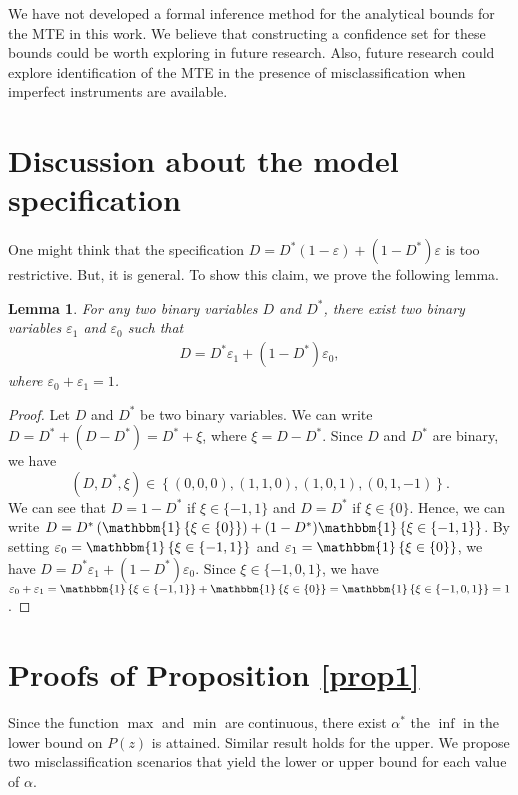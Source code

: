 \documentclass[11pt,reqno]{amsart}
\theoremstyle{plain}
\newtheorem{lemma}{Lemma}
\numberwithin{equation}{section}
\begin{document}
We have not developed a formal inference method for the analytical bounds for the MTE in this work. We believe that constructing a confidence set for these bounds could be worth exploring in future research. Also, future research could explore identification of the MTE in the presence of misclassification when imperfect instruments are available. 

\clearpage
\appendix

\section{Discussion about the model specification}\label{apx:spec}
One might think that the specification $D=D^* (1-\varepsilon) +(1-D^*)\varepsilon$ is too restrictive. But, it is general. To show this claim, we prove the following lemma.
\begin{lemma}\label{misc:specific}
For any two binary variables $D$ and $D^*$, there exist two binary variables $\varepsilon_1$ and $\varepsilon_0$ such that 
\begin{eqnarray}
D=D^* \varepsilon_1 +(1-D^*)\varepsilon_0,
\end{eqnarray}
where $\varepsilon_0+\varepsilon_1=1$.
\end{lemma}
\begin{proof}
Let $D$ and $D^*$ be two binary variables. We can write $D=D^*+(D-D^*)=D^*+\xi$, where $\xi=D-D^*$. Since $D$ and $D^*$ are binary, we have $$\left(D,D^*,\xi\right) \in \left\{(0,0,0),(1,1,0),(1,0,1),(0,1,-1)\right\}.$$ We can see that $D=1-D^*$ if $\xi\in\{-1,1\}$ and $D=D^*$  if $\xi\in\{0\}$. Hence, we can write $D=D^*\left(\mathbbm{1}\left\{\xi\in\{0\}\right\}\right)+(1-D^*) \mathbbm{1}\left\{\xi\in\{-1,1\}\right\}$. By setting $\varepsilon_0=\mathbbm{1}\left\{\xi\in\{-1,1\}\right\}$ and $\varepsilon_1=\mathbbm{1}\left\{\xi\in\{0\}\right\}$, we have $D=D^* \varepsilon_1 +(1-D^*)\varepsilon_0$. Since $\xi\in\{-1,0,1\}$, we have $\varepsilon_0+\varepsilon_1=\mathbbm{1}\left\{\xi\in\{-1,1\}\right\}+\mathbbm{1}\left\{\xi\in\{0\}\right\}=\mathbbm{1}\left\{\xi\in\{-1,0,1\}\right\}=1$. 
\end{proof}



\section{Proofs of Proposition \ref{prop1}}\label{proofprop1}
Since the function $\max$ and $\min$ are continuous, there exist $\alpha^*$ the $\inf$ in the lower bound on $P(z)$ is attained. Similar result holds for the upper. We propose two misclassification scenarios that yield the lower or upper bound for each value of $\alpha$.
\end{document}
